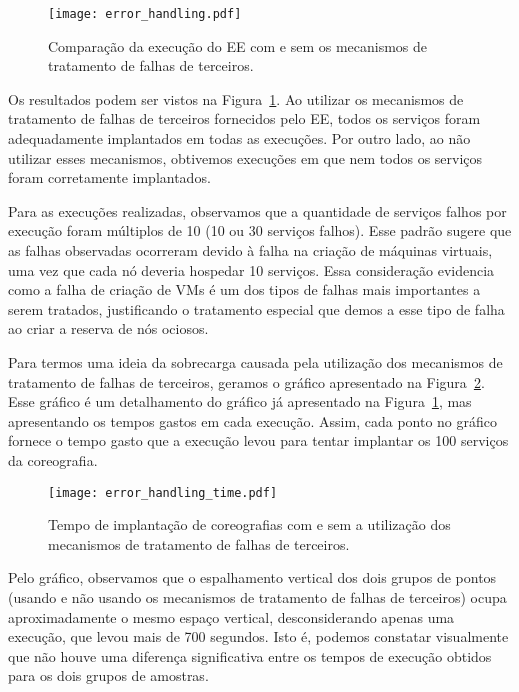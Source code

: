 \begin{figure}[h]
  \centering
  \texttt{[image: error\_handling.pdf]}
  \caption{Comparação da execução do EE com e sem os mecanismos de tratamento de falhas de terceiros.}
  \label{fig:error_handling}
\end{figure}

Os resultados podem ser vistos na Figura~\ref{fig:error_handling}.
Ao utilizar os mecanismos de tratamento de falhas de terceiros fornecidos pelo EE,
todos os serviços foram adequadamente implantados em todas as execuções.
Por outro lado, ao não utilizar esses mecanismos, obtivemos execuções em que nem todos
os serviços foram corretamente implantados.

Para as execuções realizadas, observamos que
a quantidade de serviços falhos por execução foram múltiplos de 10
(10 ou 30 serviços falhos).
Esse padrão sugere que as falhas observadas
ocorreram devido à falha na criação de máquinas virtuais,
uma vez que cada nó deveria hospedar 10 serviços.
Essa consideração evidencia como a falha de criação de VMs é um
dos tipos de falhas mais importantes a serem tratados,
justificando o tratamento especial que demos a esse tipo de falha
ao criar a reserva de nós ociosos.

Para termos uma ideia da sobrecarga causada pela utilização dos mecanismos de 
tratamento de falhas de terceiros, geramos o gráfico apresentado 
na Figura~\ref{fig:error_handling_time}.
Esse gráfico é um detalhamento do gráfico já apresentado na Figura~\ref{fig:error_handling},
mas apresentando os tempos gastos em cada execução.
Assim, cada ponto no gráfico fornece o tempo gasto que a execução levou
para tentar implantar os 100 serviços da coreografia.

\begin{figure}[h]
  \centering
  \texttt{[image: error\_handling\_time.pdf]}
  \caption{Tempo de implantação de coreografias com e sem a utilização dos mecanismos de tratamento de falhas de terceiros.}
  \label{fig:error_handling_time}
\end{figure}

Pelo gráfico, observamos que o espalhamento vertical dos dois grupos de pontos
(usando e não usando os mecanismos de tratamento de falhas de terceiros) 
ocupa aproximadamente o mesmo espaço vertical, desconsiderando apenas uma execução, 
que levou mais de 700 segundos.
Isto é, podemos constatar visualmente que não houve uma diferença significativa
entre os tempos de execução obtidos para os dois grupos de amostras.

